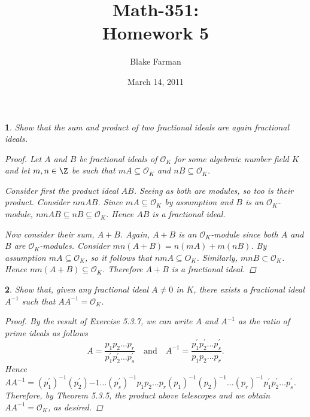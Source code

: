 \documentclass[10pt]{amsart}
\author{Blake Farman}
\title{Math-351:\\Homework 5}
\date{March 14, 2011}
\begin{document}
\maketitle

\newtheorem{thm}{}

\newcommand{\OO}{\mathcal{O}}

\begin{thm}
  \label{Ex1}
  Show that the sum and product of two fractional ideals are again fractional ideals.
  \begin{proof}
    Let $A$ and $B$ be fractional ideals of $\OO_K$ for some algebraic number field $K$ and let $m,n \in \Z$ be such that $mA \subseteq \OO_K$ and $nB \subseteq \OO_K$.
    
    Consider first the product ideal $AB$.  
    Seeing as both are modules, so too is their product.
    Consider $nmAB$.
    Since $mA \subseteq \OO_K$ by assumption and $B$ is an $\OO_K$-module, $nmAB \subseteq nB \subseteq \OO_K$.
    Hence $AB$ is a fractional ideal.
    
    Now consider their sum, $A + B$.
    Again, $A + B$ is an $\OO_K$-module since both $A$ and $B$ are $\OO_K$-modules.
    Consider $mn(A + B) = n(mA) + m(nB)$.
    By assumption $mA \subseteq \OO_K$, so it follows that $nmA \subseteq O_K$.
    Similarly, $mnB \subset \OO_K$.
    Hence $mn(A+B) \subseteq \OO_K$.
    Therefore $A+B$ is a fractional ideal.
  \end{proof}
\end{thm}

\begin{thm}
  \label{Ex2}
  Show that, given any fractional ideal $A \not = 0$ in $K$, there exists a fractional ideal $A^{-1}$ such that $AA^{-1} = \OO_K$.
  \begin{proof}
    By the result of Exercise 5.3.7, we can write $A$ and $A^{-1}$ as the ratio of prime ideals as follows
    $$A = \frac{p_1p_2\ldots p_r}{p_1^{\prime}p_2^{\prime}\ldots p_s^{\prime}} \quad \text{and} \quad A^{-1} = \frac{p_1^{\prime}p_2^{\prime}\ldots p_s^{\prime}}{p_1p_2\ldots p_r}.$$
    Hence $AA^{-1} = (p_1^{\prime})^{-1}(p_2^{\prime}){-1}\ldots (p_s^{\prime})^{-1}p_1p_2\ldots p_r (p_1)^{-1}(p_2)^{-1}\ldots (p_r)^{-1} p_1^{\prime}p_2^{\prime}\ldots p_s^{\prime}$.
    Therefore, by Theorem 5.3.5, the product above telescopes and we obtain $AA^{-1} = \OO_K$, as desired.
  \end{proof}
\end{thm}
\end{document}

